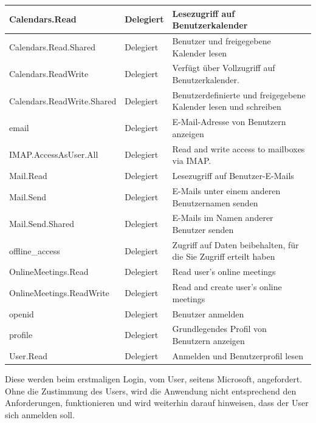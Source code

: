     \begin{tabularx}{\textwidth}{|X|X|X|}
        \toprule
        \textbf{Calendars.Read} & \textbf{Delegiert} & \textbf{Lesezugriff auf Benutzerkalender}\\
        \midrule
        Calendars.Read.Shared & Delegiert & Benutzer und freigegebene Kalender lesen\\
        Calendars.ReadWrite & Delegiert & Verfügt über Vollzugriff auf Benutzerkalender.\\
        Calendars.ReadWrite.Shared & Delegiert & Benutzerdefinierte und freigegebene Kalender lesen und schreiben\\
        email & Delegiert & E-Mail-Adresse von Benutzern anzeigen \\
        IMAP.AccessAsUser.All & Delegiert & Read and write access to mailboxes via IMAP.\\
        Mail.Read & Delegiert & Lesezugriff auf Benutzer-E-Mails\\
        Mail.Send & Delegiert & E-Mails unter einem anderen Benutzernamen senden\\
        Mail.Send.Shared & Delegiert & E-Mails im Namen anderer Benutzer senden\\
        offline\_access & Delegiert & Zugriff auf Daten beibehalten, für die Sie Zugriff erteilt haben\\
        OnlineMeetings.Read & Delegiert & Read user's online meetings\\
        OnlineMeetings.ReadWrite & Delegiert & Read and create user's online meetings\\
        openid & Delegiert & Benutzer anmelden\\
        profile & Delegiert & Grundlegendes Profil von Benutzern anzeigen\\
        User.Read & Delegiert & Anmelden und Benutzerprofil lesen\\
        \bottomrule
    \end{tabularx}
    \caption{}
    \label{tab:}
\newline
\newline
\raggedright
\normalsize
Diese werden beim erstmaligen Login, vom User, seitens Microsoft, angefordert.
Ohne die Zustimmung des Users, wird die Anwendung nicht entsprechend den Anforderungen, funktionieren und wird weiterhin darauf hinweisen, dass der User sich anmelden soll.
